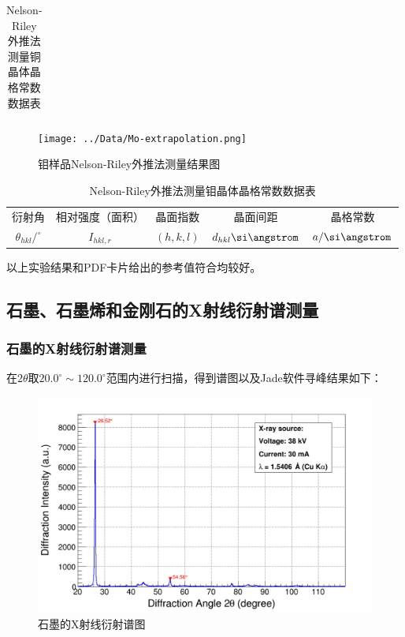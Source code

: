 \documentclass{thuemp}
\begin{document}
\begin{table}[H]
    \centering
    \captionnamefont{\wuhao\bf\heiti}
    \captiontitlefont{\wuhao\bf\heiti}
    \caption{Nelson-Riley外推法测量铜晶体晶格常数数据表}
    \label{tab:cu_xrd_extrapol}
    \liuhao
    \begin{tabular}{ccccc}
        \toprule
        \midrule
        \bottomrule
    \end{tabular}
\end{table}

\begin{figure}[H]
    \centering
    \texttt{[image: ../Data/Mo-extrapolation.png]}
    \caption{钼样品Nelson-Riley外推法测量结果图}
    \label{fig:mo_xrd_extrapol}
\end{figure}

\begin{table}[H]
    \centering
    \captionnamefont{\wuhao\bf\heiti}
    \captiontitlefont{\wuhao\bf\heiti}
    \caption{Nelson-Riley外推法测量钼晶体晶格常数数据表}
    \label{tab:mo_xrd_extrapol}
    \liuhao
    \begin{tabular}{ccccc}
        \toprule
        衍射角 & 相对强度（面积）& 晶面指数 & 晶面间距 & 晶格常数 \\
        $\theta_{hkl}/^\circ$ & $I_{hkl,r}$ & $(h,k,l)$ & $d_{hkl}\text{\si\angstrom}$ & $a/\text{\si\angstrom}$\\
        \midrule
        \bottomrule
    \end{tabular}
\end{table}

以上实验结果和PDF卡片给出的参考值符合均较好。

\subsection{石墨、石墨烯和金刚石的X射线衍射谱测量}

\subsubsection{石墨的X射线衍射谱测量}

在$2\theta$取$20.0^\circ \sim 120.0^\circ$范围内进行扫描，得到谱图以及Jade软件寻峰结果如下：

\begin{figure}[H]
    \centering
    \includegraphics[width=0.8\linewidth]{../Data/C-Graphite-multi.png}
    \caption{石墨的X射线衍射谱图}
    \label{fig:graphite_xrd}
\end{figure}
\end{document}
